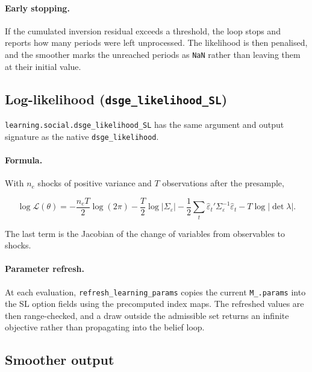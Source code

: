 \documentclass[11pt,a4paper]{article}
\newcommand{\field}[1]{\texttt{#1}}
\begin{document}
\paragraph{Early stopping.} If the cumulated inversion residual exceeds a
threshold, the loop stops and reports how many periods were left unprocessed.
The likelihood is then penalised, and the smoother marks the unreached periods
as \texttt{NaN} rather than leaving them at their initial value.


\subsection{Log-likelihood (\texttt{dsge\_likelihood\_SL})}
\label{sec:estimation:likelihood}

\texttt{learning.social.dsge\_likelihood\_SL} has the same argument and output
signature as the native \texttt{dsge\_likelihood}.

\paragraph{Formula.} With $n_e$ shocks of positive variance and $T$
observations after the presample,

\begin{equation}
\log \mathcal{L}(\theta) =
  -\frac{n_e T}{2}\log(2\pi)
  - \frac{T}{2}\log\bigl|\Sigma_\varepsilon\bigr|
  - \frac{1}{2}\sum_{t}\hat{\varepsilon}_t'\Sigma_\varepsilon^{-1}\hat{\varepsilon}_t
  - T \log\bigl|\det \lambda\bigr| .
\end{equation}

The last term is the Jacobian of the change of variables from observables to
shocks.

\paragraph{Parameter refresh.} At each evaluation,
\texttt{refresh\_learning\_params} copies the current \field{M\_.params} into
the SL option fields using the precomputed index maps. The refreshed values are then range-checked, and
a draw outside the admissible set returns an infinite objective rather than
propagating into the belief loop.


\subsection{Smoother output}
\label{sec:estimation:smoother}
\end{document}
